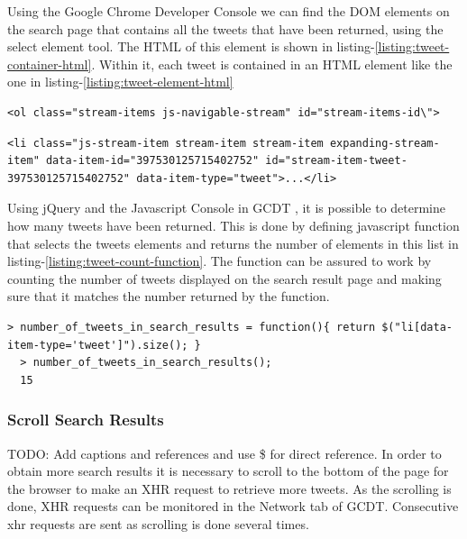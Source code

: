 Using the Google Chrome Developer Console \cite{gcdt} we can find the DOM elements on the search page that contains all the tweets that have been returned, using the select element tool. The HTML of this element is shown in listing-\ref{listing:tweet-container-html}. Within it, each tweet is contained in an HTML element like the one in listing-\ref{listing:tweet-element-html}

  \begin{lstlisting}[caption={HTML of the element containing all tweet elements},label={listing:tweet-container-html},captionpos=b]
  <ol class="stream-items js-navigable-stream" id="stream-items-id\">
  \end{lstlisting}

  \begin{lstlisting}[caption={HTML of a tweet element},label={listing:tweet-element-html},captionpos=b]
  <li class="js-stream-item stream-item stream-item expanding-stream-item" data-item-id="397530125715402752" id="stream-item-tweet-397530125715402752" data-item-type="tweet">...</li>
  \end{lstlisting}

Using jQuery \cite{jquery} and the Javascript Console in GCDT \cite{gcdt}, it is possible to determine how many tweets have been returned. This is done by defining javascript function that selects the tweets elements and returns the number of elements in this list in listing-\ref{listing:tweet-count-function}. The function can be assured to work by counting the number of tweets displayed on the search result page and making sure that it matches the number returned by the function.

  \begin{lstlisting}[caption={Creating a function in GCDT Javascript Console for counting the occurance of tweets on the twitter search result page},label={listing:tweet-count-function},captionpos=b]
  > number_of_tweets_in_search_results = function(){ return $("li[data-item-type='tweet']").size(); }
  > number_of_tweets_in_search_results();
  15
  \end{lstlisting}

\subsubsection{Scroll Search Results}
TODO: Add captions and references and use \$ for direct reference.
In order to obtain more search results it is necessary to scroll to the bottom of the page for the browser to make an XHR request to retrieve more tweets. As the scrolling is done, XHR requests can be monitored in the Network tab of GCDT. Consecutive xhr requests are sent as scrolling is done several times.

